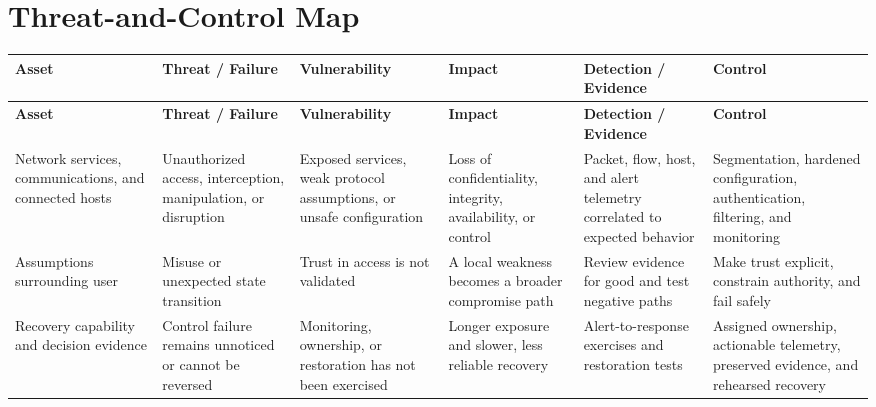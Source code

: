 \documentclass[11pt,letterpaper]{article}
\begin{document}
\section*{Threat-and-Control Map}
\begingroup\scriptsize\setlength{\tabcolsep}{2pt}
\begin{longtable}{>{\raggedright\arraybackslash}p{}>{\raggedright\arraybackslash}p{}>{\raggedright\arraybackslash}p{}>{\raggedright\arraybackslash}p{}>{\raggedright\arraybackslash}p{}>{\raggedright\arraybackslash}p{}}
\toprule\rowcolor{Navy}\color{white}\textbf{Asset} & \color{white}\textbf{Threat / Failure} & \color{white}\textbf{Vulnerability} & \color{white}\textbf{Impact} & \color{white}\textbf{Detection / Evidence} & \color{white}\textbf{Control}\\\midrule
\endfirsthead
\toprule\rowcolor{Navy}\color{white}\textbf{Asset} & \color{white}\textbf{Threat / Failure} & \color{white}\textbf{Vulnerability} & \color{white}\textbf{Impact} & \color{white}\textbf{Detection / Evidence} & \color{white}\textbf{Control}\\\midrule
\endhead
Network services, communications, and connected hosts & Unauthorized access, interception, manipulation, or disruption & Exposed services, weak protocol assumptions, or unsafe configuration & Loss of confidentiality, integrity, availability, or control & Packet, flow, host, and alert telemetry correlated to expected behavior & Segmentation, hardened configuration, authentication, filtering, and monitoring\\\midrule
Assumptions surrounding user & Misuse or unexpected state transition & Trust in access is not validated & A local weakness becomes a broader compromise path & Review evidence for good and test negative paths & Make trust explicit, constrain authority, and fail safely\\\midrule
Recovery capability and decision evidence & Control failure remains unnoticed or cannot be reversed & Monitoring, ownership, or restoration has not been exercised & Longer exposure and slower, less reliable recovery & Alert-to-response exercises and restoration tests & Assigned ownership, actionable telemetry, preserved evidence, and rehearsed recovery\\\midrule
\bottomrule
\end{longtable}
\endgroup
\end{document}

